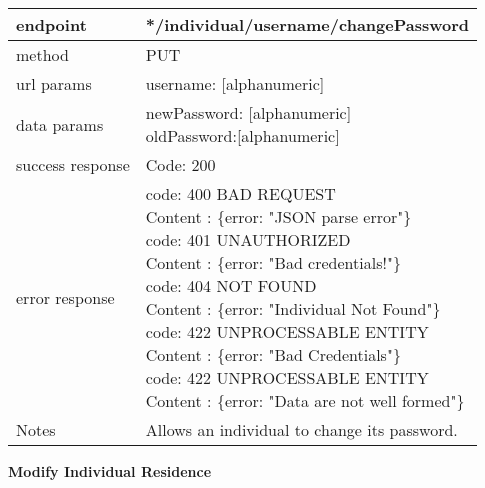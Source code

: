\begin{tabularx}{\linewidth}{| l| l }
	\hline
	endpoint & */individual/{username}/changePassword \\
	\hline
	method & PUT \\
	\hline
	url params & 
	\parbox{0.7\textwidth}{
		\bigskip
		username: [alphanumeric]
		\bigskip
	}\\
	\hline
	data params & 
	\parbox{0.7\textwidth}{
		\bigskip
		newPassword: [alphanumeric]\\
		oldPassword:[alphanumeric]
		\bigskip
	} \\
	\hline
	success response &
	\parbox{0.7\textwidth}{
		\bigskip
		Code: 200
		\bigskip
	} \\
	\hline
	error response &
	\parbox{0.7\textwidth}{
		\bigskip
		code: 400 BAD REQUEST \\
		Content : \{error: "JSON parse error"\}\\
		code: 401 UNAUTHORIZED \\
		Content : \{error: "Bad credentials!"\}\\
		code: 404 NOT FOUND \\
		Content : \{error: "Individual Not Found"\}\\
		code: 422 UNPROCESSABLE ENTITY\\
		Content : \{error: "Bad Credentials"\}\\
		code: 422 UNPROCESSABLE ENTITY\\
		Content : \{error: "Data are not well formed"\}
		\bigskip
	} \\
	\hline
	Notes & \parbox{0.7\textwidth}{
		\bigskip
		Allows an individual to change its password.
		\bigskip
	} \\
	\hline
\end{tabularx}

\textbf{Modify Individual Residence}\\

